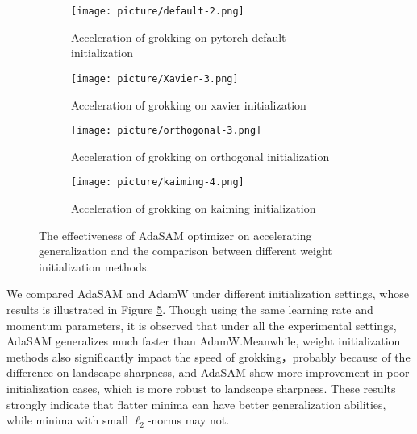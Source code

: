 \documentclass{article}
\begin{document}
\begin{figure}[htbp]
  \centering
   \begin{subfigure}[b]{0.33\textwidth}
        \centering
    \texttt{[image: picture/default-2.png]}
    \caption{Acceleration of grokking on pytorch default initialization}
    \label{fig8:sub1}
  \end{subfigure}
  \hspace{1em} %
     \begin{subfigure}[b]{0.33\textwidth}
        \centering
    \texttt{[image: picture/Xavier-3.png]}
    \caption{Acceleration of grokking on xavier initialization}
    \label{fig8:sub2}
  \end{subfigure}
  \hspace{1em} %
     \begin{subfigure}[b]{0.33\textwidth}
        \centering
    \texttt{[image: picture/orthogonal-3.png]}
    \caption{Acceleration of grokking on orthogonal initialization}
    \label{fig8:sub3}
  \end{subfigure}
  \hspace{1em} %
    \begin{subfigure}[b]{0.33\textwidth}
        \centering
    \texttt{[image: picture/kaiming-4.png]}
    \caption{Acceleration of grokking on kaiming initialization}
    \label{fig8:sub4}
  \end{subfigure}
  
  
  \renewcommand{\figurename}{Figure}
  \caption{The effectiveness of AdaSAM optimizer on accelerating generalization and the comparison between different weight initialization methods. }
  \label{fig8:main}
\end{figure}

\vspace{-0.5em}

We compared AdaSAM and AdamW under different initialization settings, whose results is illustrated in Figure \ref{fig8:main}. Though using the same learning rate and momentum parameters, it is observed that under all the experimental settings, AdaSAM generalizes much faster than AdamW.Meanwhile, weight initialization methods also significantly impact the speed of grokking，probably because of the difference on landscape sharpness, and AdaSAM show more improvement in poor initialization cases, which is more robust to landscape sharpness. These results strongly indicate that flatter minima can have better generalization abilities, while minima with small $\ell_2$-norms may not.
\end{document}
